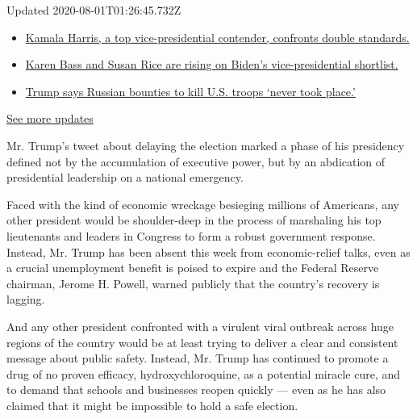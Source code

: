 Updated 2020-08-01T01:26:45.732Z

\begin{itemize}
\tightlist
\item
  \href{https://www.nytimes3xbfgragh.onion/2020/07/31/us/elections/biden-vs-trump.html?action=click\&pgtype=Article\&state=default\&region=MAIN_CONTENT_1\&context=storylines_live_updates\#link-29fdff45}{Kamala
  Harris, a top vice-presidential contender, confronts double
  standards.}
\item
  \href{https://www.nytimes3xbfgragh.onion/2020/07/31/us/elections/biden-vs-trump.html?action=click\&pgtype=Article\&state=default\&region=MAIN_CONTENT_1\&context=storylines_live_updates\#link-13ec3d9c}{Karen
  Bass and Susan Rice are rising on Biden's vice-presidential
  shortlist.}
\item
  \href{https://www.nytimes3xbfgragh.onion/2020/07/31/us/elections/biden-vs-trump.html?action=click\&pgtype=Article\&state=default\&region=MAIN_CONTENT_1\&context=storylines_live_updates\#link-49e9a016}{Trump
  says Russian bounties to kill U.S. troops `never took place.'}
\end{itemize}

\href{https://www.nytimes3xbfgragh.onion/2020/07/31/us/elections/biden-vs-trump.html?action=click\&pgtype=Article\&state=default\&region=MAIN_CONTENT_1\&context=storylines_live_updates}{See
more updates}

Mr. Trump's tweet about delaying the election marked a phase of his
presidency defined not by the accumulation of executive power, but by an
abdication of presidential leadership on a national emergency.

Faced with the kind of economic wreckage besieging millions of
Americans, any other president would be shoulder-deep in the process of
marshaling his top lieutenants and leaders in Congress to form a robust
government response. Instead, Mr. Trump has been absent this week from
economic-relief talks, even as a crucial unemployment benefit is poised
to expire and the Federal Reserve chairman, Jerome H. Powell, warned
publicly that the country's recovery is lagging.

And any other president confronted with a virulent viral outbreak across
huge regions of the country would be at least trying to deliver a clear
and consistent message about public safety. Instead, Mr. Trump has
continued to promote a drug of no proven efficacy, hydroxychloroquine,
as a potential miracle cure, and to demand that schools and businesses
reopen quickly --- even as he has also claimed that it might be
impossible to hold a safe election.

